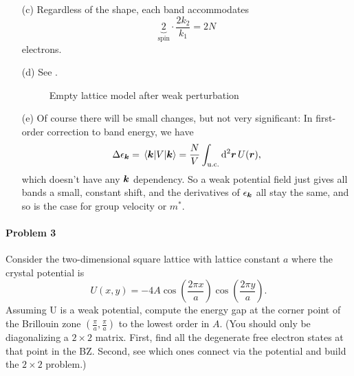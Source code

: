 \documentclass[hyperref, a4paper]{article}
\begin{document}
\begin{itemize}
\item[(c)] Regardless of the shape,
each band accommodates 
\begin{equation}
    \underbrace{2}_{\text{spin}} \cdot \frac{2 k_2}{k_1} = 2N
\end{equation}
electrons.

\item[(d)] See .

\begin{figure}
    \centering
    
    \caption{Empty lattice model after weak perturbation}
    \label{fig:weak-perturbation}
\end{figure}

\item[(e)] Of course there will be small changes, but not very significant:
In first-order correction to band energy,
we have 
\begin{equation}
    \Delta \epsilon_{\vb*{k}} = \mel{\vb*{k}}{V}{\vb*{k}}
    = \frac{N}{V} \int_{\text{u.c.}} \dd[2]{\vb*{r}} U(\vb*{r}),
\end{equation}
which doesn't have any $\vb*{k}$ dependency.
So a weak potential field just gives all bands a small, constant shift,
and the derivatives of $\epsilon_{\vb*{k}}$ all stay the same,
and so is the case for group velocity or $m^*$.

\end{itemize}

\paragraph{Problem 3} Consider the two-dimensional square lattice with lattice constant $a$ where the crystal potential is
$$
U(x, y)=-4 A \cos \left(\frac{2 \pi x}{a}\right) \cos \left(\frac{2 \pi y}{a}\right) .
$$
Assuming $\mathrm{U}$ is a weak potential, compute the energy gap at the corner point of the Brillouin zone $\left(\frac{\pi}{a}, \frac{\pi}{a}\right)$ to the lowest order in $A$. (You should only be diagonalizing a $2 \times 2$ matrix. First, find all the degenerate free electron states at that point in the BZ. Second, see which ones connect via the potential and build the $2 \times 2$ problem.)
\end{document}
